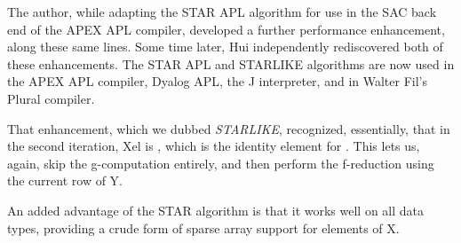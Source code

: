 The author, while adapting the STAR APL algorithm for use
in the SAC back end of the APEX APL compiler, developed 
a further performance enhancement, along these same 
lines.\cite{RBernecky:apex}
Some time later, Hui independently rediscovered both of these
enhancements.\cite{RKWHui:innerproduct}
The STAR APL and STARLIKE algorithms are now used in 
the APEX APL compiler, Dyalog APL, the J interpreter, and
in Walter Fil's Plural compiler.

That enhancement, which we dubbed {\em STARLIKE},
recognized, essentially, that
in the second iteration, {\apl Xel}
is {}, which is the identity element for {\apl \qand}.
This lets us, again, skip the {\apl g}-computation entirely,
and then perform the {\apl f}-reduction using the current row of Y.

An added advantage of the STAR algorithm is that it works well
on all data types, providing a crude form of sparse array support
for elements of {\apl X}.

